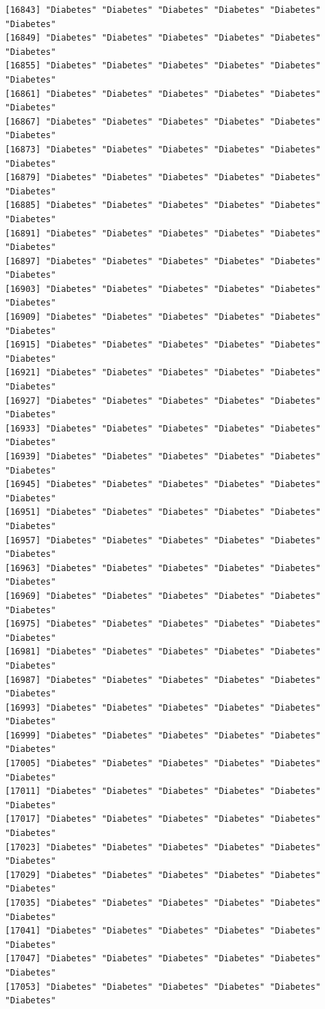 \documentclass[
  letterpaper,
  DIV=11,
  numbers=noendperiod]{scrartcl}
\begin{document}
\begin{verbatim}
[16843] "Diabetes" "Diabetes" "Diabetes" "Diabetes" "Diabetes" "Diabetes"
[16849] "Diabetes" "Diabetes" "Diabetes" "Diabetes" "Diabetes" "Diabetes"
[16855] "Diabetes" "Diabetes" "Diabetes" "Diabetes" "Diabetes" "Diabetes"
[16861] "Diabetes" "Diabetes" "Diabetes" "Diabetes" "Diabetes" "Diabetes"
[16867] "Diabetes" "Diabetes" "Diabetes" "Diabetes" "Diabetes" "Diabetes"
[16873] "Diabetes" "Diabetes" "Diabetes" "Diabetes" "Diabetes" "Diabetes"
[16879] "Diabetes" "Diabetes" "Diabetes" "Diabetes" "Diabetes" "Diabetes"
[16885] "Diabetes" "Diabetes" "Diabetes" "Diabetes" "Diabetes" "Diabetes"
[16891] "Diabetes" "Diabetes" "Diabetes" "Diabetes" "Diabetes" "Diabetes"
[16897] "Diabetes" "Diabetes" "Diabetes" "Diabetes" "Diabetes" "Diabetes"
[16903] "Diabetes" "Diabetes" "Diabetes" "Diabetes" "Diabetes" "Diabetes"
[16909] "Diabetes" "Diabetes" "Diabetes" "Diabetes" "Diabetes" "Diabetes"
[16915] "Diabetes" "Diabetes" "Diabetes" "Diabetes" "Diabetes" "Diabetes"
[16921] "Diabetes" "Diabetes" "Diabetes" "Diabetes" "Diabetes" "Diabetes"
[16927] "Diabetes" "Diabetes" "Diabetes" "Diabetes" "Diabetes" "Diabetes"
[16933] "Diabetes" "Diabetes" "Diabetes" "Diabetes" "Diabetes" "Diabetes"
[16939] "Diabetes" "Diabetes" "Diabetes" "Diabetes" "Diabetes" "Diabetes"
[16945] "Diabetes" "Diabetes" "Diabetes" "Diabetes" "Diabetes" "Diabetes"
[16951] "Diabetes" "Diabetes" "Diabetes" "Diabetes" "Diabetes" "Diabetes"
[16957] "Diabetes" "Diabetes" "Diabetes" "Diabetes" "Diabetes" "Diabetes"
[16963] "Diabetes" "Diabetes" "Diabetes" "Diabetes" "Diabetes" "Diabetes"
[16969] "Diabetes" "Diabetes" "Diabetes" "Diabetes" "Diabetes" "Diabetes"
[16975] "Diabetes" "Diabetes" "Diabetes" "Diabetes" "Diabetes" "Diabetes"
[16981] "Diabetes" "Diabetes" "Diabetes" "Diabetes" "Diabetes" "Diabetes"
[16987] "Diabetes" "Diabetes" "Diabetes" "Diabetes" "Diabetes" "Diabetes"
[16993] "Diabetes" "Diabetes" "Diabetes" "Diabetes" "Diabetes" "Diabetes"
[16999] "Diabetes" "Diabetes" "Diabetes" "Diabetes" "Diabetes" "Diabetes"
[17005] "Diabetes" "Diabetes" "Diabetes" "Diabetes" "Diabetes" "Diabetes"
[17011] "Diabetes" "Diabetes" "Diabetes" "Diabetes" "Diabetes" "Diabetes"
[17017] "Diabetes" "Diabetes" "Diabetes" "Diabetes" "Diabetes" "Diabetes"
[17023] "Diabetes" "Diabetes" "Diabetes" "Diabetes" "Diabetes" "Diabetes"
[17029] "Diabetes" "Diabetes" "Diabetes" "Diabetes" "Diabetes" "Diabetes"
[17035] "Diabetes" "Diabetes" "Diabetes" "Diabetes" "Diabetes" "Diabetes"
[17041] "Diabetes" "Diabetes" "Diabetes" "Diabetes" "Diabetes" "Diabetes"
[17047] "Diabetes" "Diabetes" "Diabetes" "Diabetes" "Diabetes" "Diabetes"
[17053] "Diabetes" "Diabetes" "Diabetes" "Diabetes" "Diabetes" "Diabetes"

\end{verbatim}
\end{document}
